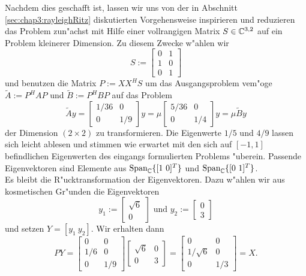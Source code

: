 \newpage

Nachdem dies geschafft ist, lassen wir uns von der in Abschnitt \ref{sec:chap3:rayleighRitz} diskutierten Vorgehensweise inspirieren und reduzieren das Problem zun"achst mit
Hilfe einer vollrangigen Matrix $S \in\mathbb{C}^{3,2}$ auf ein Problem kleinerer Dimension.
Zu diesem Zwecke w"ahlen wir
\[
S:=\begin{bmatrix} 0 & 1 \\ 1 & 0 \\ 0 & 1\end{bmatrix}
\]
und benutzen die Matrix $P :=X X^H S$ um das Ausgangsproblem vem"oge
$\widetilde{A}:= P^H A P$ und $\widetilde{B}:=P^H B P$ auf das Problem
\[
\widetilde{A}y = \begin{bmatrix}1/36 & 0\\0 & 1/9 \end{bmatrix} y = \mu \begin{bmatrix}5/36 & 0\\0 & 1/4 \end{bmatrix} y = \mu \widetilde{B}y
\]
der Dimension $(2\times 2)$ zu transformieren. Die Eigenwerte $1/5$ und $4/9$ lassen sich leicht ablesen
und stimmen wie erwartet mit den sich auf $[-1,1]$ befindlichen Eigenwerten des eingangs formulierten Problems "uberein. Passende Eigenvektoren sind
Elemente aus $\text{Span}_{\mathbb{C}} \{[1 \ 0]^T\}$ und $\text{Span}_{\mathbb{C}} \{[0 \ 1]^T\}$.\\

Es bleibt die R"ucktransformation der Eigenvektoren. Dazu w"ahlen wir aus kosmetischen Gr"unden die Eigenvektoren
\[
y_1 := \begin{bmatrix}
\sqrt6 \\ 0
\end{bmatrix}
\text{ und }
y_2 := \begin{bmatrix}
0 \\ 3
\end{bmatrix}
\]
und setzen $Y = [y_1 \ y_2]$. Wir erhalten dann
\[
PY = \begin{bmatrix} 0 & 0 \\ 1/6 & 0 \\ 0 & 1/9 \end{bmatrix}
\begin{bmatrix}
\sqrt6 & 0 \\ 0 & 3
\end{bmatrix}
=
\begin{bmatrix} 0 & 0  \\ 1/\sqrt6 & 0  \\ 0 & 1/3  \end{bmatrix}
= X.
\]

